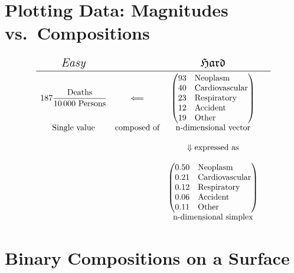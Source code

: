 \documentclass{beamer}
\begin{document}
\section{Plotting Data: Magnitudes vs.~Compositions} %

\begin{frame}
\frametitle{\insertsection}

$$
\begin{matrix*}[c]
\mbox{\Large$\mathit{Easy}$} & & \mbox{\Large$\mathfrak{Hard}$} \\\midrule
187 \dfrac {\text{Deaths}} {10\,000~\text{Persons}} &
\Longleftarrow &
\begin{pmatrix*}[l]
93 & \text{Neoplasm} \\
40 & \text{Cardiovascular} \\
23 & \text{Respiratory} \\
12 & \text{Accident} \\
19 & \text{Other}
\end{pmatrix*} \\
\text{Single~value} & \text{composed~of} & \text{n-dimensional~vector} \\
& & & \\
& & \Downarrow \text{expressed~as} \\
& & & \\
& & \begin{pmatrix*}[l]
0.50 & \text{Neoplasm} \\
0.21 & \text{Cardiovascular} \\
0.12 & \text{Respiratory} \\
0.06 & \text{Accident} \\
0.11 & \text{Other}
\end{pmatrix*} \\
& & \text{n-dimensional simplex}
\end{matrix*}
$$

\end{frame}

\section{Binary Compositions on a Surface} %
\end{document}
